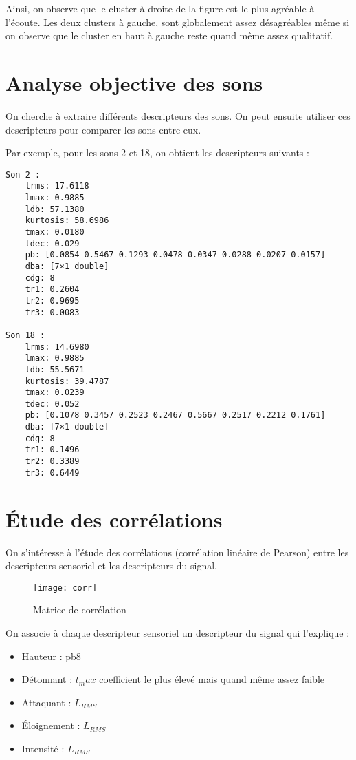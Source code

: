 \documentclass[12pt,a4paper,titlepage]{article}
\begin{document}
Ainsi, on observe que le cluster à droite de la figure est le
plus agréable à l'écoute. Les deux clusters à gauche, sont
globalement assez désagréables même si on observe que le cluster en
haut à gauche reste quand même assez qualitatif.

\section{Analyse objective des sons}

On cherche à extraire différents descripteurs des sons.
On peut ensuite utiliser ces descripteurs pour comparer les
sons entre eux.

Par exemple, pour les sons 2 et 18, on obtient les descripteurs suivants :

\begin{verbatim}
Son 2 :
    lrms: 17.6118
    lmax: 0.9885
    ldb: 57.1380
    kurtosis: 58.6986
    tmax: 0.0180
    tdec: 0.029
    pb: [0.0854 0.5467 0.1293 0.0478 0.0347 0.0288 0.0207 0.0157]
    dba: [7×1 double]
    cdg: 8
    tr1: 0.2604
    tr2: 0.9695
    tr3: 0.0083

Son 18 :
    lrms: 14.6980
    lmax: 0.9885
    ldb: 55.5671
    kurtosis: 39.4787
    tmax: 0.0239
    tdec: 0.052
    pb: [0.1078 0.3457 0.2523 0.2467 0.5667 0.2517 0.2212 0.1761]
    dba: [7×1 double]
    cdg: 8
    tr1: 0.1496
    tr2: 0.3389
    tr3: 0.6449
\end{verbatim}

\section{Étude des corrélations}

On s'intéresse à l'étude des corrélations (corrélation linéaire de Pearson) entre les descripteurs
sensoriel et les descripteurs du signal.

\begin{figure}[H]
    \caption{Matrice de corrélation}
    \texttt{[image: corr]}
    \centering
\end{figure}

On associe à chaque descripteur sensoriel un descripteur du signal qui l'explique :

\begin{itemize}
    \item{Hauteur : pb8}
    \item{Détonnant : $t_max$ coefficient le plus élevé mais quand même assez faible}
    \item{Attaquant : $L_{RMS}$}
    \item{Éloignement : $L_{RMS}$}
    \item{Intensité : $L_{RMS}$}
\end{itemize}
\end{document}
